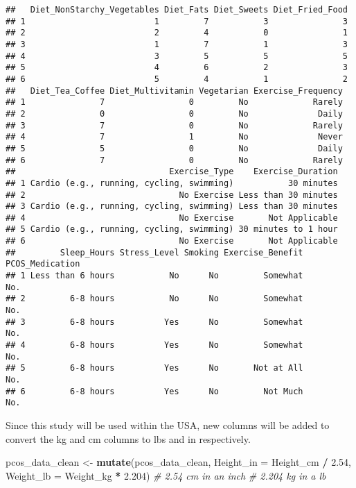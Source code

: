 \documentclass[
]{article}
\newenvironment{Shaded}{\begin{snugshade}}{\end{snugshade}}
\newcommand{\AttributeTok}[1]{\textcolor[rgb]{0.13,0.29,0.53}{#1}}
\newcommand{\CommentTok}[1]{\textcolor[rgb]{0.56,0.35,0.01}{\textit{#1}}}
\newcommand{\FloatTok}[1]{\textcolor[rgb]{0.00,0.00,0.81}{#1}}
\newcommand{\FunctionTok}[1]{\textcolor[rgb]{0.13,0.29,0.53}{\textbf{#1}}}
\newcommand{\NormalTok}[1]{#1}
\newcommand{\OtherTok}[1]{\textcolor[rgb]{0.56,0.35,0.01}{#1}}
\newcommand{\SpecialCharTok}[1]{\textcolor[rgb]{0.81,0.36,0.00}{\textbf{#1}}}
\begin{document}
\begin{verbatim}
##   Diet_NonStarchy_Vegetables Diet_Fats Diet_Sweets Diet_Fried_Food
## 1                          1         7           3               3
## 2                          2         4           0               1
## 3                          1         7           1               3
## 4                          3         5           5               5
## 5                          4         6           2               3
## 6                          5         4           1               2
##   Diet_Tea_Coffee Diet_Multivitamin Vegetarian Exercise_Frequency
## 1               7                 0         No             Rarely
## 2               0                 0         No              Daily
## 3               7                 0         No             Rarely
## 4               7                 1         No              Never
## 5               5                 0         No              Daily
## 6               7                 0         No             Rarely
##                               Exercise_Type    Exercise_Duration
## 1 Cardio (e.g., running, cycling, swimming)           30 minutes
## 2                               No Exercise Less than 30 minutes
## 3 Cardio (e.g., running, cycling, swimming) Less than 30 minutes
## 4                               No Exercise       Not Applicable
## 5 Cardio (e.g., running, cycling, swimming) 30 minutes to 1 hour
## 6                               No Exercise       Not Applicable
##         Sleep_Hours Stress_Level Smoking Exercise_Benefit PCOS_Medication
## 1 Less than 6 hours           No      No         Somewhat             No.
## 2         6-8 hours           No      No         Somewhat             No.
## 3         6-8 hours          Yes      No         Somewhat             No.
## 4         6-8 hours          Yes      No         Somewhat             No.
## 5         6-8 hours          Yes      No       Not at All             No.
## 6         6-8 hours          Yes      No         Not Much             No.
\end{verbatim}

Since this study will be used within the USA, new columns will be added
to convert the kg and cm columns to lbs and in respectively.

\begin{Shaded}
\begin{Highlighting}[]
\NormalTok{pcos\_data\_clean }\OtherTok{\textless{}{-}} \FunctionTok{mutate}\NormalTok{(pcos\_data\_clean, }\AttributeTok{Height\_in =}\NormalTok{ Height\_cm }\SpecialCharTok{/} \FloatTok{2.54}\NormalTok{, }\AttributeTok{Weight\_lb =}\NormalTok{ Weight\_kg }\SpecialCharTok{*} \FloatTok{2.204}\NormalTok{)}
\CommentTok{\# 2.54 cm in an inch}
\CommentTok{\# 2.204 kg in a lb}
\end{Highlighting}
\end{Shaded}
\end{document}
